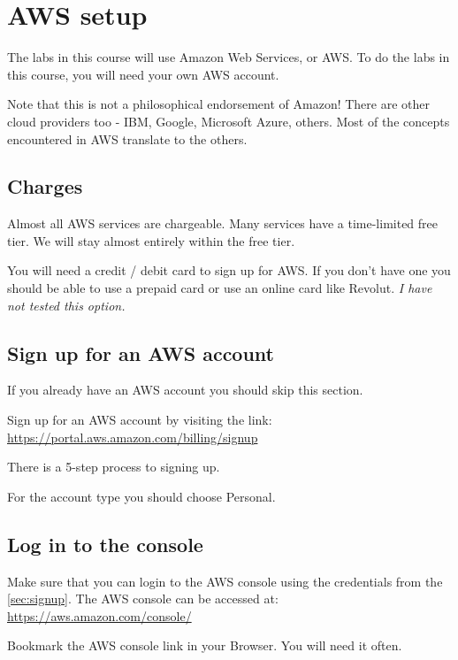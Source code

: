 \chapter{AWS setup}
\label{ch:aws-setup}

The labs in this course will use Amazon Web Services, or AWS.
To do the labs in this course, you will need your own AWS account.

Note that this is not a philosophical endorsement of Amazon!
There are other cloud providers too - IBM, Google, Microsoft Azure, others.
Most of the concepts encountered in AWS translate to the others.

\section{Charges}
\label{sec:charges}

Almost all AWS services are chargeable.
Many services have a time-limited free tier.
We will stay almost entirely within the free tier. 

You will need a credit / debit card to sign up for AWS.
If you don't have one you should be able to use a prepaid card or use an online card like Revolut.
\textit{I have not tested this option.}

\section{Sign up for an AWS account}
\label{sec:signup}

If you already have an AWS account you should skip this section.

Sign up for an AWS account by visiting the link:\\
\url{https://portal.aws.amazon.com/billing/signup}

There is a 5-step process to signing up.

For the account type you should choose Personal.

\section{Log in to the console}

Make sure that you can login to the AWS console using the credentials from the \autoref{sec:signup}.
The AWS console can be accessed at:\\
\url{https://aws.amazon.com/console/}

Bookmark the AWS console link in your Browser. You will need it often.


